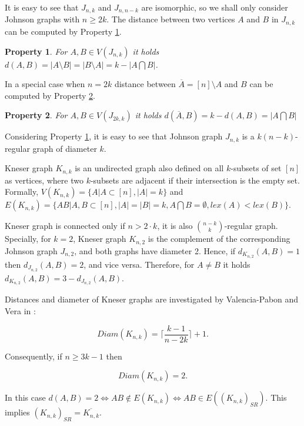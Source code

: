 \documentclass[preprint,12pt]{elsarticle}
\newtheorem{prp}{Property}
\begin{document}
It is easy to see that $J_{n,k}$ and $J_{n,n-k}$ are isomorphic, so
we shall only consider Johnson graphs with $n \ge 2k$.
The distance between two vertices $A$ and $B$ in $J_{n,k}$
can be computed by Property \ref{distj}.

\begin{prp} \label{distj} For $A,B \in V(J_{n,k})$ it holds 
$d(A,B) = |A \setminus B| = |B \setminus A| = k-|A \bigcap B|$.
\end{prp}

In a special case when $n=2k$ distance between $\overline{A} = [n] \setminus A$ and $B$ can be
computed by Property \ref{comp}.

\begin{prp} \label{comp} For $A,B \in V(J_{2k,k})$ it holds $d(\overline{A},B) = k - d(A,B) = |A \bigcap B|$
\end{prp}
 
Considering  Property \ref{distj}, it is easy to see that Johnson graph $J_{n,k}$ is a $k (n-k)$-regular graph 
of diameter $k$. 

Kneser graph $K_{n,k}$ is an undirected graph also defined on all $k$-subsets of set $[n]$ as vertices,
where two $k$-subsets are adjacent if their intersection is the empty set.
Formally, $V(K_{n,k}) = \{ A | A \subset [n], |A|=k\}$ and
$E(K_{n,k}) = \{ AB | A,B \subset [n], |A|=|B|=k, A \bigcap B= \emptyset, lex(A) < lex(B)\}$.

Kneser graph is connected only if $n > 2 \cdot k$, it is also $\binom{n-k}{k}$-regular graph.
Specially, for $k=2$, Kneser graph $K_{n,2}$ is the complement of the corresponding 
Johnson graph $J_{n,2}$, and both graphs have diameter 2. Hence, if $d_{K_{n,2}}(A,B)=1$
then $d_{J_{n,2}}(A,B)=2$, and vice versa. Therefore, for $A \ne B$ it holds 
$d_{K_{n,2}}(A,B) = 3 - d_{J_{n,2}}(A,B)$.
 
Distances and diameter of Kneser graphs are investigated by Valencia-Pabon and Vera in \cite{pab05}:

\begin{equation} \label{diam1} 
Diam(K_{n,k}) = \lceil \frac{k-1}{n-2k} \rceil + 1.
\end{equation}

Consequently, if $n \ge 3k-1$ then 

\begin{equation} \label{diam2} 
Diam(K_{n,k}) = 2.
\end{equation}

In this case $d(A,B) = 2 \Leftrightarrow AB \notin E(K_{n,k}) \Leftrightarrow AB \in E((K_{n,k})_{SR})$. 
This implies $(K_{n,k})_{SR} = \overline{K_{n,k}}$.\\
\end{document}
